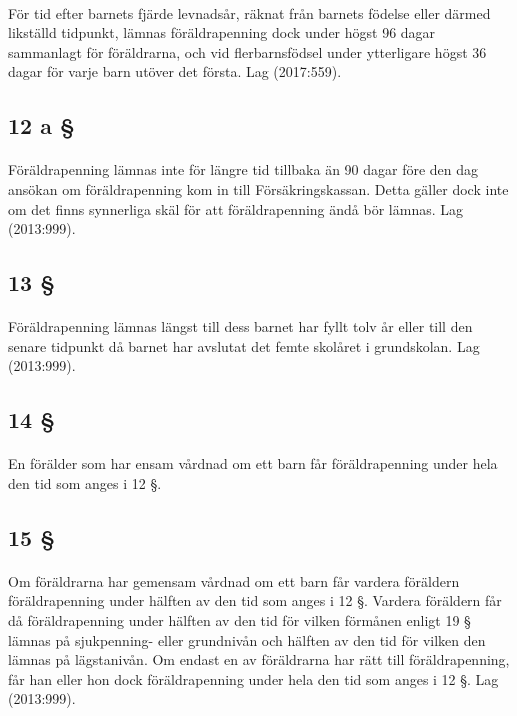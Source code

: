 \documentclass[a4paper,notitlepage,openany,10pt]{book}
\begin{document}
\paragraph*{}
För tid efter barnets fjärde levnadsår, räknat från barnets födelse eller därmed likställd tidpunkt, lämnas föräldrapenning dock under högst 96 dagar sammanlagt för föräldrarna, och vid flerbarnsfödsel under ytterligare högst 36 dagar för varje barn utöver det första.
Lag (2017:559).
\subsection*{12 a §}
\paragraph*{}
Föräldrapenning lämnas inte för längre tid tillbaka än 90 dagar före den dag ansökan om föräldrapenning kom in till Försäkringskassan. Detta gäller dock inte om det finns synnerliga skäl för att föräldrapenning ändå bör lämnas.
Lag (2013:999).
\subsection*{13 §}
\paragraph*{}
Föräldrapenning lämnas längst till dess barnet har fyllt tolv år eller till den senare tidpunkt då barnet har avslutat det femte skolåret i grundskolan.
Lag (2013:999).
\subsection*{14 §}
\paragraph*{}
En förälder som har ensam vårdnad om ett barn får föräldrapenning under hela den tid som anges i 12 §.
\subsection*{15 §}
\paragraph*{}
Om föräldrarna har gemensam vårdnad om ett barn får vardera föräldern föräldrapenning under hälften av den tid som anges i 12 §. Vardera föräldern får då föräldrapenning under hälften av den tid för vilken förmånen enligt 19 § lämnas på sjukpenning- eller grundnivån och hälften av den tid för vilken den lämnas på lägstanivån. Om endast en av föräldrarna har rätt till föräldrapenning, får han eller hon dock föräldrapenning under hela den tid som anges i 12 §.
Lag (2013:999).
\end{document}
